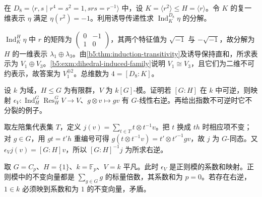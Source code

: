 \begin{exercise}\label{b5:ex:03-tower-d8}
	在 \(D_8=\langle r,s\mid r^4=s^2=1,srs=r^{-1}\rangle\) 中，设 \(K=\langle r^2\rangle\le H=\langle r\rangle\)。令 \(K\) 的复一维表示 \(\eta\) 满足 \(\eta(r^2)=-1\)。利用诱导传递性求 \(\operatorname{Ind}_K^{D_8}\eta\) 的分解。
\end{exercise}
\begin{solution}
	\(\operatorname{Ind}_K^H\eta\) 中 \(r\) 的矩阵为 \(\left(\begin{smallmatrix}0&-1\\1&0\end{smallmatrix}\right)\)，其两个特征值为 \(\sqrt{-1}\) 与 \(-\sqrt{-1}\)，故分解为 \(H\) 的一维表示 \(\lambda_1\oplus\lambda_3\)。由\cref{b5:thm:induction-transitivity}及诱导保持直和，所求表示为 \(V_1\oplus V_3\)。\cref{b5:exm:dihedral-induced-family}说明 \(V_1\cong V_3\)，且它们为二维不可约表示，故答案为 \(V_1^{\oplus2}\)。总维数为 \(4=[D_8:K]\)。
\end{solution}

\begin{exercise}\label{b5:ex:03-counit-splitting}
	设 \(k\) 为域，\(H\le G\) 为有限群，\(V\) 为 \(k[G]\)-模。证明若 \([G:H]\) 在 \(k\) 中可逆，则映射 \(\epsilon_V:\operatorname{Ind}_H^G\operatorname{Res}_H^G V\rightarrow V\)、\(g\otimes v\mapsto gv\) 有 \(G\)-线性右逆。再给出指数不可逆时它不分裂的例子。
\end{exercise}
\begin{solution}
	取左陪集代表集 \(T\)，定义 \(j(v)=\sum_{t\in T}t\otimes t^{-1}v\)。把 \(t\) 换成 \(th\) 时相应项不变；对 \(g\in G\)，用 \(gt=t'h\) 重编号可得 \(g(t\otimes t^{-1}v)=t'\otimes t'^{-1}gv\)，故 \(j\) 为 \(G\)-同态。又 \(\epsilon_Vj(v)=[G:H]v\)，所以 \([G:H]^{-1}j\) 为所求右逆。

	取 \(G=C_p\)、\(H=\{1\}\)、\(k=\mathbb F_p\)、\(V=k\) 平凡。此时 \(\epsilon_V\) 是正则模的系数和映射。正则模中的不变向量都是 \(\sum_{g\in G}g\) 的标量倍数，其系数和为 \(p=0\)。若存在右逆，\(1\in k\) 必须映到系数和为 \(1\) 的不变向量，矛盾。
\end{solution}

